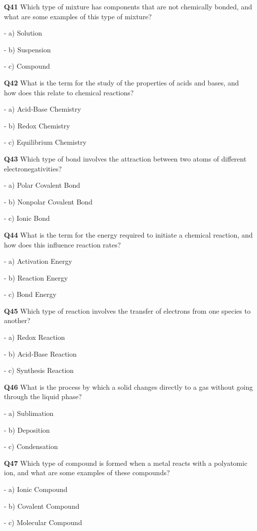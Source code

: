 \textbf{Q41} Which type of mixture has components that are not chemically bonded, and what are some examples of this type of mixture?\par
\quad - a) Solution\par
\quad - b) Suspension\par
\quad - c) Compound\par

\textbf{Q42} What is the term for the study of the properties of acids and bases, and how does this relate to chemical reactions?\par
\quad - a) Acid‑Base Chemistry\par
\quad - b) Redox Chemistry\par
\quad - c) Equilibrium Chemistry\par

\textbf{Q43} Which type of bond involves the attraction between two atoms of different electronegativities?\par
\quad - a) Polar Covalent Bond\par
\quad - b) Nonpolar Covalent Bond\par
\quad - c) Ionic Bond\par

\textbf{Q44} What is the term for the energy required to initiate a chemical reaction, and how does this influence reaction rates?\par
\quad - a) Activation Energy\par
\quad - b) Reaction Energy\par
\quad - c) Bond Energy\par

\textbf{Q45} Which type of reaction involves the transfer of electrons from one species to another?\par
\quad - a) Redox Reaction\par
\quad - b) Acid‑Base Reaction\par
\quad - c) Synthesis Reaction\par

\textbf{Q46} What is the process by which a solid changes directly to a gas without going through the liquid phase?\par
\quad - a) Sublimation\par
\quad - b) Deposition\par
\quad - c) Condensation\par

\textbf{Q47} Which type of compound is formed when a metal reacts with a polyatomic ion, and what are some examples of these compounds?\par
\quad - a) Ionic Compound\par
\quad - b) Covalent Compound\par
\quad - c) Molecular Compound\par

